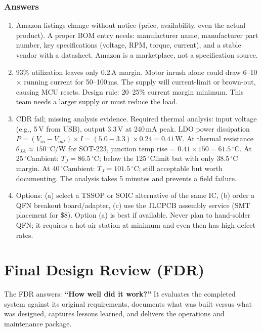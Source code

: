 \documentclass[11pt,letterpaper,twoside,openany]{book}
\newcommand{\degC}{\ensuremath{{}^{\circ}\text{C}}}
\begin{document}
\subsection{Answers}
\begin{enumerate}[leftmargin=1.5em]
\item Amazon listings change without notice (price, availability, even the actual product). A proper BOM entry needs: manufacturer name, manufacturer part number, key specifications (voltage, RPM, torque, current), and a stable vendor with a datasheet. Amazon is a marketplace, not a specification source.
\item 93\% utilization leaves only 0.2\,A margin. Motor inrush alone could draw 6--10$\times$ running current for 50--100\,ms. The supply will current-limit or brown-out, causing MCU resets. Design rule: 20--25\% current margin minimum. This team needs a larger supply or must reduce the load.

\item CDR fail; missing analysis evidence. Required thermal analysis: input voltage (e.g., 5\,V from USB), output 3.3\,V at 240\,mA peak. LDO power dissipation $P = (V_{in} - V_{out}) \times I = (5.0 - 3.3) \times 0.24 = 0.41$\,W. At thermal resistance $\theta_{JA} \approx 150$\,\degC/W for SOT-223, junction temp rise = $0.41 \times 150 = 61.5$\,\degC. At 25\,\degC ambient: $T_J = 86.5$\,\degC; below the 125\,\degC limit but with only 38.5\,\degC margin. At 40\,\degC ambient: $T_J = 101.5$\,\degC; still acceptable but worth documenting. The analysis takes 5 minutes and prevents a field failure.
\item Options: (a) select a TSSOP or SOIC alternative of the same IC, (b) order a QFN breakout board/adapter, (c) use the JLCPCB assembly service (SMT placement for \$8). Option (a) is best if available. Never plan to hand-solder QFN; it requires a hot air station at minimum and even then has high defect rates.
\end{enumerate}


\chapter{Final Design Review (FDR)}

\vspace{1em}

The FDR answers: \textbf{``How well did it work?''} It evaluates the completed system against its original requirements, documents what was built versus what was designed, captures lessons learned, and delivers the operations and maintenance package.
\end{document}
